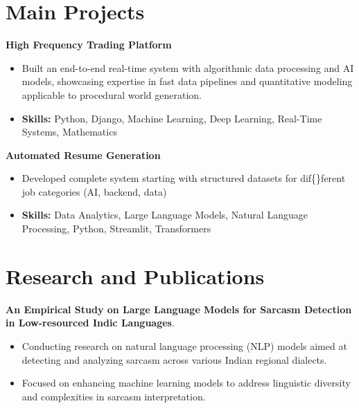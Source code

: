 \documentclass[a4paper,11pt]{article}
\begin{document}
\section{\textbf{Main Projects}}

\vspace{1mm}
  \textbf{High Frequency Trading Platform  }
\vspace{-1.5mm} %
\begin{itemize}
  \item Built an end-to-end real-time system with algorithmic data processing and AI models, showcasing expertise in fast data pipelines and quantitative modeling applicable to procedural world generation.
\vspace{-3mm}
  \item \textbf{Skills:} Python, Django, Machine Learning, Deep Learning, Real-Time Systems, Mathematics
\end{itemize}


\vspace{1mm}
   \textbf{Automated Resume Generation }
\vspace{-1.5mm} %
\begin{itemize}
  \item Developed complete system starting with structured datasets for dif\{\}ferent job categories (AI, backend, data)
\vspace{-3mm}
  \item \textbf{Skills:} Data Analytics, Large Language Models, Natural Language Processing, Python, Streamlit, Transformers
\end{itemize}



\section{\textbf{Research and Publications} \hfill }
\vspace{1mm}
  \textbf{An Empirical Study on Large Language Models for Sarcasm Detection in Low-resourced Indic Languages}.
\vspace{-1mm} %
\begin{itemize}
  \item Conducting research on natural language processing (NLP) models aimed at detecting and analyzing sarcasm across various Indian regional dialects.
\vspace{-3mm}
  \item Focused on enhancing machine learning models to address linguistic diversity and complexities in sarcasm interpretation.
\end{itemize}
\end{document}
